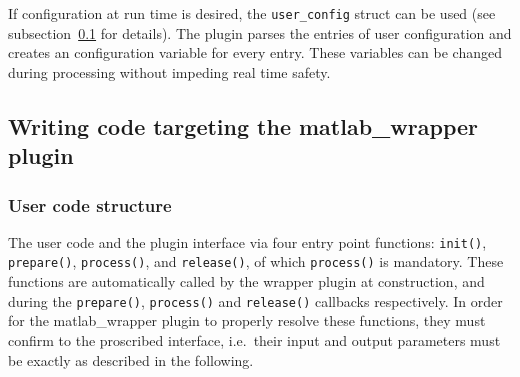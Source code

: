 \documentclass[11pt,a4paper,twoside]{article}
\newcommand{\+}{\discretionary{\mbox{\scriptsize$\hookleftarrow$}}{}{}}
\begin{document}
If configuration at run time is desired, the \texttt{user\_config}
struct can be used (see subsection~\ref{subsec:writing_code} for details).
The plugin parses the entries of user configuration and creates an
\mha{} configuration variable for every entry. These variables can be
changed during processing without impeding real time safety.

\subsection{Writing code targeting the matlab\_wrapper plugin}\label{subsec:writing_code}
\subsubsection{User code structure}
The user code and the plugin interface via four entry point functions:
\texttt{init()}, \texttt{prepare()}, \texttt{process()}, and \texttt{release()}, of which \texttt{process()} is mandatory.
These functions are automatically called by the wrapper plugin at construction, and during the \texttt{prepare()},
\texttt{process()} and \texttt{release()} callbacks respectively.
In order for the matlab\_wrapper plugin to properly resolve these functions, they must confirm to the proscribed interface,
i.e.\ their input and output parameters must be exactly as described in the following.\\
\end{document}

